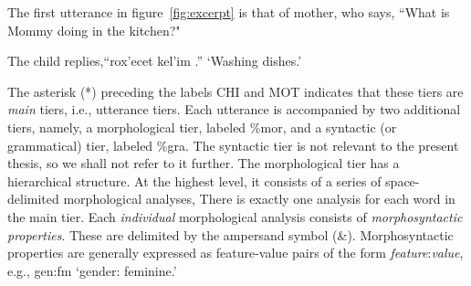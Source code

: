 The first utterance in figure~\ref{fig:excerpt} is that of mother,
who says, ``What is Mommy doing in the kitchen?" 

The child
replies,``\textsf{rox\a'{e}cet kel\a'{i}m .}'' `Washing dishes.'

The asterisk (*) 
preceding the labels \textsf{CHI} and \textsf{MOT} indicates 
that these tiers are \emph{main} tiers, i.e.,  
utterance tiers. Each utterance is accompanied by two additional tiers, 
namely, a morphological tier, labeled \textsf{\%mor}, and a syntactic 
(or grammatical) tier, labeled \textsf{\%gra}. 
The syntactic tier is not relevant to the present thesis,
so we shall not refer to it further.
The morphological 
tier has a hierarchical structure. At the highest level, it consists of a 
series of space-delimited morphological analyses, 
There is exactly one analysis for each word in the main tier.  
Each \emph{individual} morphological analysis consists
of \textit{morphosyntactic properties}. These are delimited by the ampersand symbol (\textsf{\&}). 
Morphosyntactic properties are 
generally expressed as feature-value pairs of the 
form \textsf{\textit{feature}:\textit{value}}, e.g., \textsf{gen:fm} `gender: feminine.'


